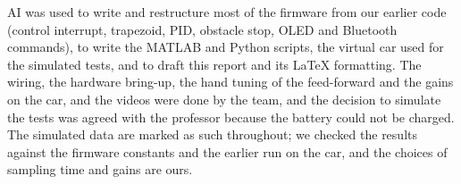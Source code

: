 \documentclass[letterpaper, 11pt]{article}
\begin{document}
AI was used to write and restructure most of the firmware from our earlier code
(control interrupt, trapezoid, PID, obstacle stop, OLED and Bluetooth commands), to
write the MATLAB and Python scripts, the virtual car used for the simulated tests,
and to draft this report and its \LaTeX{} formatting. The wiring, the hardware
bring-up, the hand tuning of the feed-forward and the gains on the car, and the
videos were done by the team, and the decision to simulate the tests was agreed with
the professor because the battery could not be charged. The simulated data are
marked as such throughout; we checked the results against the firmware constants and
the earlier run on the car, and the choices of sampling time and gains are ours.
\end{document}
